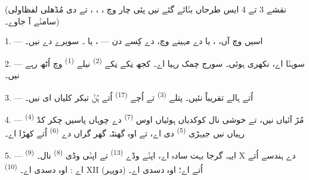 %

\VUsaut{3.0mm}
\VUsaut{1.6mm}
\VUsaut{3.4mm}

(نقشے 3 تے 4 ایس طرحاں بݨائے گئے نیں پئی چار  وچ
، ، ،  تے  دی
مُڈھلی لفظاولی سامݨے آ جاوے۔)
\VUsaut{4.0mm}

\VUsaut{3.0mm}

\VUsaut{2.4mm}

\VUsaut{3.0mm}

1. --- اسیں  وچ آں، ،  یا 
دے مہینے وچ،  دے کِسے دن --- ،  یا
۔ سویرے دے  نیں۔

2. ---  سوہݨا اے،  نکھری ہوئی۔ سورج چمک رہیا اے۔ کجھ
نِکے نِکے  \textsuperscript{(2)} نیلے 
\textsuperscript{(1)} وچ اُٹھ رہے نیں۔

3. ---  اُتے ہالے  تقریباً نئیں۔ پتلے
 \textsuperscript{(3)} تے اُچے  \textsuperscript{(17)}
اُتے ہُݨ تیکر کلیاں ای نیں۔

4. ---  \textsuperscript{(4)} مُڑ آئیاں نیں، تے خوشی نال کوکدیاں
ہوئیاں اوس  \textsuperscript{(7)} دے چوہاں پاسیں چکر کڈ رہیاں نیں
جیہڑی  \textsuperscript{(5)} دی اے، تے اوہ گھنٹہ گھر گراں دے
 \textsuperscript{(6)} اُتے کھڑا اے۔

\VUsaut{3.4mm}
\VUsaut{3.0mm}

5. --- ایہہ گرجا بہت سادہ اے، اپݨے وڈے  \textsuperscript{(13)} تے
اپݨی وڈی  \textsuperscript{(8)} نال۔ 
\textsuperscript{(9)} X دے ہندسے اُتے اے : اوہ  دسدی اے۔
 \textsuperscript{(10)} XII (دوپہر) اُتے اے؛ اوہ 
دسدی اے۔

